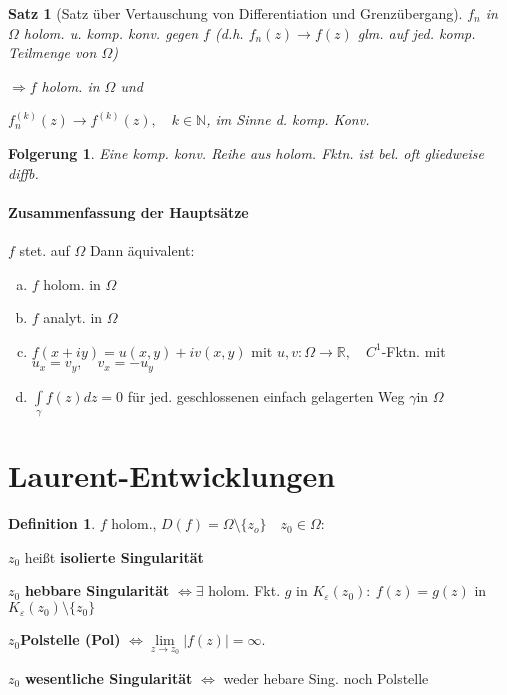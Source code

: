 \documentclass[ngerman,halfparskip]{scrartcl}
\newtheorem*{satz*}{Satz}
\newtheorem{folg}{Folgerung}[section]
\theoremstyle{definition}
\newtheorem{defin}{Definition}[section]
\def\R{\mathbb R}
\def\N{\mathbb N}
\begin{document}
\begin{satz*}[Satz über Vertauschung von Differentiation und Grenzübergang]
$f_n$ in $\Omega$ holom. u. komp. konv. gegen $f$ (d.h. $f_n(z)\rightarrow f(z)$ glm. auf jed. komp. Teilmenge von $\Omega$)

$\Rightarrow f$ holom. in $\Omega$ und

$f_n^{(k)}(z)\rightarrow f^{(k)}(z), \quad k\in\N$, im Sinne d. komp. Konv.
\end{satz*}

\begin{folg}
Eine komp. konv. Reihe aus holom. Fktn. ist bel. oft gliedweise diffb.
\end{folg}

\paragraph{Zusammenfassung der Hauptsätze}$f$ stet. auf $\Omega$ Dann äquivalent:
\begin{enumerate}[a)]
\item $f$ holom. in $\Omega$
\item $f$ analyt. in $\Omega$
\item $f(x+iy)=u(x,y)+iv(x,y)$ mit $u,v:\Omega\rightarrow \R, \quad C^1$-Fktn. mit $u_x=v_y, \quad v_x=-u_y$
\item $\int\limits_\gamma f(z)dz=0$ für jed. geschlossenen einfach gelagerten Weg $\gamma $in $\Omega$ 
\end{enumerate}


\section{Laurent-Entwicklungen}
\begin{defin}
$f$ holom., $D(f)=\Omega\setminus \{z_o\} \quad z_0\in\Omega:$

$z_0$ heißt \textbf{isolierte Singularität}

$z_0$ \textbf{hebbare Singularität} $\Leftrightarrow \exists$ holom. Fkt. $g$ in $K_\varepsilon(z_0): ~ f(z)=g(z) $ in $K_\varepsilon(z_0)\setminus\{z_0\}$

$z_0$\textbf{Polstelle (Pol)} $\Leftrightarrow \lim\limits_{z\rightarrow z_0}|f(z)|=\infty.$

$z_0$ \textbf{wesentliche Singularität} $\Leftrightarrow$ weder hebare Sing. noch Polstelle
\end{defin}
\end{document}
